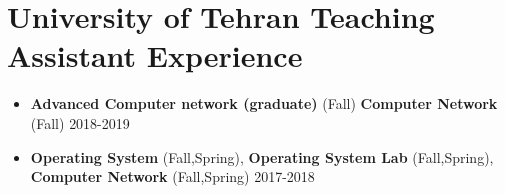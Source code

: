 \documentclass[a4paper,10pt]{article} %
\begin{document}
\color{blue}
\section{University of Tehran Teaching Assistant Experience}
\color{Black}
\begin{itemize}
	
	\item	
		\textbf{Advanced Computer network (graduate)} (Fall) 
		\textbf{Computer Network} (Fall)
		\hfill {2018-2019}
	
	\item	
		\textbf{Operating System} (Fall,Spring), 
		\textbf{Operating System Lab} (Fall,Spring), 
		\textbf{Computer Network} (Fall,Spring)
		\hfill {2017-2018}
	

\end{itemize}
\end{document}
